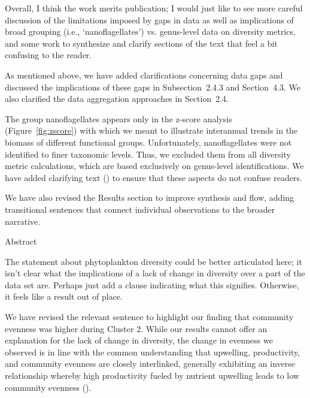 \documentclass[12pt,english]{reviewresponse}
\begin{document}
\begin{revcomment} 
	Overall, I think the work merits publication; I would just like to see more careful discussion of the limitations imposed by gaps in data as well as implications of broad grouping (i.e., ‘nanoflagellates’) vs. genus-level data on diversity metrics, and some work to synthesize and clarify sections of the text that feel a bit confusing to the reader.
\end{revcomment}
\begin{revresponse}
    As mentioned above, we have added clarifications concerning data gaps and discussed the implications of these gaps in Subsection~2.4.3 and Section~4.3. We also clarified the data aggregation approaches in Section~2.4.
    
    The group nanoflagellates appears only in the z-score analysis (Figure~\ref{fig:zscore}) with which we meant to illustrate interannual trends in the biomass of different functional groups. Unfortunately, nanoflagellates were not identified to finer taxonomic levels. Thus, we excluded them from all diversity metric calculations, which are based exclusively on genus-level identifications. We have added clarifying text () to ensure that these aspects do not confuse readers.
    
    We have also revised the Results section to improve synthesis and flow, adding transitional sentences that connect individual observations to the broader narrative.
\end{revresponse}


\begin{revcomment}
	Abstract
    
    The statement about phytoplankton diversity could be better articulated here; it isn’t clear what the implications of a lack of change in diversity over a part of the data set are. Perhaps just add a clause indicating what this signifies. Otherwise, it feels like a result out of place.
\end{revcomment}
\begin{revresponse}
	We have revised the relevant sentence to highlight our finding that community evenness was higher during Cluster 2. While our results cannot offer an explanation for the lack of change in diversity, the change in evenness we observed is in line with the common understanding that upwelling, productivity, and community evenness are closely interlinked, generally exhibiting an inverse relationship whereby high productivity fueled by nutrient upwelling leads to low community evenness (\cite{lehtinen_phytoplankton_2017}).
\end{revresponse}
\end{document}
